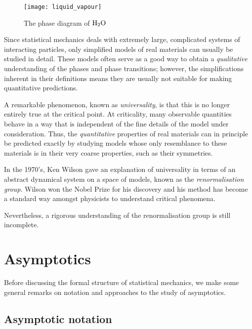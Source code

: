 \begin{figure}
\centering
\label{fig:liquid-vapour}
\texttt{[image: liquid\_vapour]}
\caption{The phase diagram of $\rm H_2 O$}
\end{figure}

Since statistical mechanics deals with extremely large, complicated systems of
interacting particles, only simplified models of real materials can usually be
studied in detail. These models often serve as a good way to obtain a
\emph{qualitative} understanding of the phases and phase transitions; however,
the simplifications inherent in their definitions means they are usually not
suitable for making quantitative predictions.

A remarkable phenomenon, known as \emph{universality}, is that this is no longer
entirely true at the critical point. At criticality, many observable quantities
behave in a way that is independent of the fine details of the model under
consideration. Thus, the \emph{quantitative} properties of real materials can in
principle be predicted exactly by studying models whose only resemblance to these
materials is in their very coarse properties, such as their symmetries.

In the 1970's, Ken Wilson gave an explanation of universality in terms of an
abstract dynamical system on a space of models, known as the \emph{renormalisation
group}. Wilson won the Nobel Prize for his discovery and his method has become
a standard way amongst physicists to understand critical phenomena.

Nevertheless, a rigorous understanding of the renormalisation group is still
incomplete.


\section{Asymptotics}
\label{sec:asymp}

Before discussing the formal structure of statistical mechanics, we make some
general remarks on notation and approaches to the study of asymptotics.


\subsection{Asymptotic notation}

